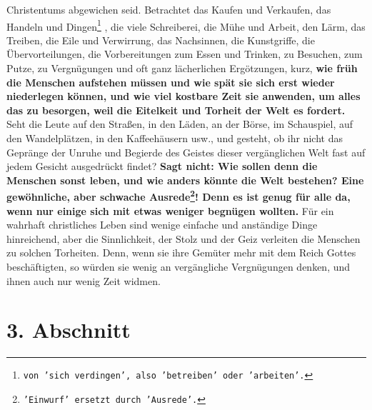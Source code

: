 Christentums abgewichen seid. Betrachtet das Kaufen und Verkaufen, das Handeln
und Dingen\footnote{\texttt{von 'sich verdingen', also 'betreiben' oder
'arbeiten'.}}
, die viele Schreiberei, die Mühe und Arbeit, den Lärm, das Treiben,
die Eile und Verwirrung, das Nachsinnen, die Kunstgriffe, die
Übervorteilungen, die Vorbereitungen zum Essen und Trinken, zu Besuchen, zum
Putze, zu Vergnügungen und oft ganz lächerlichen Ergötzungen, kurz, \textbf{wie
früh die
Menschen aufstehen müssen und wie spät sie sich erst wieder niederlegen können,
und wie viel kostbare Zeit sie anwenden, um alles das zu besorgen, weil die
Eitelkeit und Torheit der Welt es fordert.} Seht die Leute auf den Straßen, in
den
Läden, an der Börse, im Schauspiel, auf den Wandelplätzen, in den
Kaffeehäusern usw., und gesteht, ob ihr nicht das Gepränge der Unruhe und
Begierde des Geistes dieser vergänglichen Welt fast auf jedem Gesicht
ausgedrückt findet?
\label{ref:15_02_genug_fuer_alle}
\textbf{Sagt nicht: Wie sollen denn die Menschen sonst leben, und
wie anders könnte die Welt bestehen? Eine gewöhnliche, aber schwache
Ausrede\footnote{\texttt{'Einwurf' ersetzt durch 'Ausrede'.}}!
Denn es ist genug für alle da, wenn nur einige
sich mit
etwas weniger begnügen
wollten.} Für ein wahrhaft christliches Leben sind
wenige
einfache und anständige
Dinge hinreichend, aber die Sinnlichkeit, der Stolz und der Geiz verleiten die
Menschen zu solchen Torheiten. Denn, wenn sie ihre Gemüter mehr mit dem Reich
Gottes beschäftigten, so würden sie wenig an vergängliche Vergnügungen denken,
und ihnen auch nur wenig Zeit widmen.

\section{3. Abschnitt} \label{kap15_ab3}

